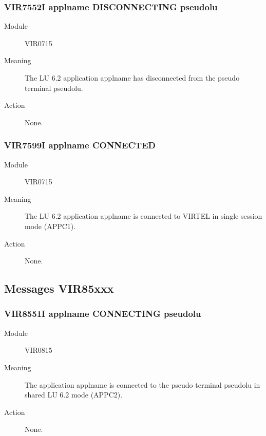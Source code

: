 \documentclass[letterpaper,10pt,english]{sphinxmanual}
\begin{document}
\subsubsection{VIR7552I applname DISCONNECTING pseudolu}
\label{\detokenize{messages:vir7552i-applname-disconnecting-pseudolu}}\begin{description}
\item[{Module}] \leavevmode
VIR0715

\item[{Meaning}] \leavevmode
The LU 6.2 application applname has disconnected from the pseudo terminal pseudolu.

\item[{Action}] \leavevmode
None.

\end{description}


\subsubsection{VIR7599I applname CONNECTED}
\label{\detokenize{messages:vir7599i-applname-connected}}\begin{description}
\item[{Module}] \leavevmode
VIR0715

\item[{Meaning}] \leavevmode
The LU 6.2 application applname is connected to VIRTEL in single session mode (APPC1).

\item[{Action}] \leavevmode
None.

\end{description}


\subsection{Messages VIR85xxx}
\label{\detokenize{messages:messages-vir85xxx}}

\subsubsection{VIR8551I applname CONNECTING pseudolu}
\label{\detokenize{messages:vir8551i-applname-connecting-pseudolu}}\begin{description}
\item[{Module}] \leavevmode
VIR0815

\item[{Meaning}] \leavevmode
The application applname is connected to the pseudo terminal pseudolu in shared LU 6.2 mode (APPC2).

\item[{Action}] \leavevmode
None.

\end{description}
\end{document}
